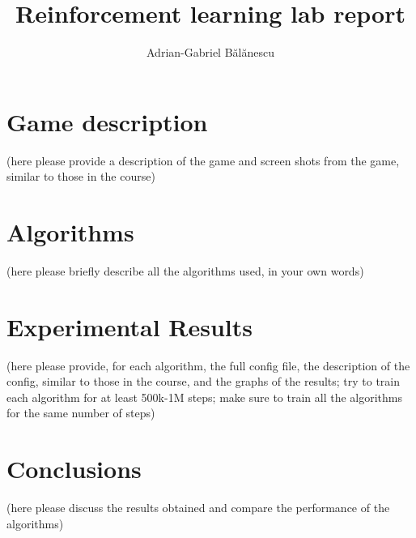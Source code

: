 \documentclass[12pt,a4paper]{report}
\author{Adrian-Gabriel Bălănescu}
\title{Reinforcement learning lab report}
\begin{document}
	\maketitle
	\tableofcontents
	
	\chapter{Game description}
	(here please provide a description of the game and screen shots from the game, similar to those in the course) \cite{noauthor_gravitar_2021}
	\chapter{Algorithms}
	(here please briefly describe all the algorithms used, in your own words)
	\chapter{Experimental Results}
	(here please provide, for each algorithm, the full config file, the description of the config, similar to those in the course, and the graphs of the results; try to train each algorithm for at least 500k-1M steps; make sure to train all the algorithms for the same number of steps)
	\chapter{Conclusions}
	(here please discuss the results obtained and compare the performance of the algorithms)
	
	
	
\end{document}

